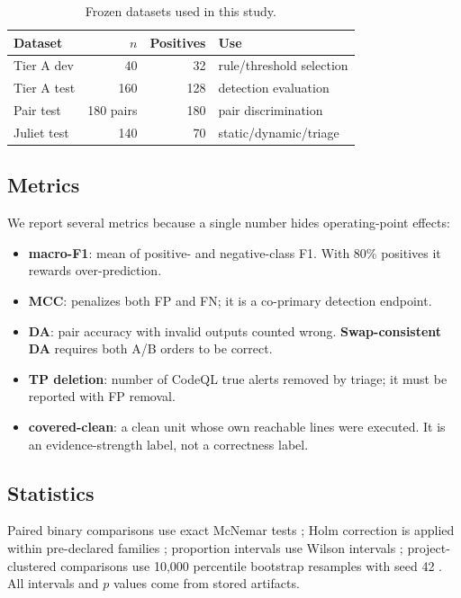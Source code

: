 \documentclass[conference]{IEEEtran}
\begin{document}
\begin{table}[t]
\centering
\caption{Frozen datasets used in this study.}
\label{tab:data}
\footnotesize
\setlength{\tabcolsep}{3pt}
\begin{tabular}{@{}lrrl@{}}
\toprule
Dataset & $n$ & Positives & Use \\
\midrule
Tier A dev & 40 & 32 & rule/threshold selection \\
Tier A test & 160 & 128 & detection evaluation \\
Pair test & 180 pairs & 180 & pair discrimination \\
Juliet test & 140 & 70 & static/dynamic/triage \\
\bottomrule
\end{tabular}
\end{table}

\subsection{Metrics}
We report several metrics because a single number hides operating-point effects:
\begin{itemize}
  \item \textbf{macro-F1}: mean of positive- and negative-class F1. With 80\% positives it rewards over-prediction.
  \item \textbf{MCC}: penalizes both FP and FN; it is a co-primary detection endpoint.
  \item \textbf{DA}: pair accuracy with invalid outputs counted wrong. \textbf{Swap-consistent DA} requires both A/B orders to be correct.
  \item \textbf{TP deletion}: number of CodeQL true alerts removed by triage; it must be reported with FP removal.
  \item \textbf{covered-clean}: a clean unit whose own reachable lines were executed. It is an evidence-strength label, not a correctness label.
\end{itemize}

\subsection{Statistics}
Paired binary comparisons use exact McNemar tests \cite{mcnemar1947}; Holm correction is applied within pre-declared families \cite{holm1979}; proportion intervals use Wilson intervals \cite{wilson1927}; project-clustered comparisons use 10,000 percentile bootstrap resamples with seed 42 \cite{efron1979}. All intervals and $p$ values come from stored artifacts.
\end{document}

